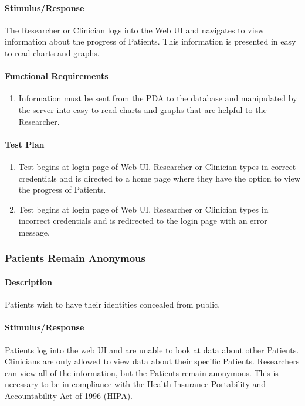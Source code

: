 \documentclass{article}
\begin{document}
\paragraph{Stimulus/Response}
The Researcher or Clinician logs into the Web UI and navigates to view information about the progress of Patients.  This information is presented in easy to read charts and graphs.

\paragraph{Functional Requirements}
\begin{enumerate}
\item Information must be sent from the PDA to the database and manipulated by the server into easy to read charts and graphs that are helpful to the Researcher.
\end{enumerate}

\paragraph{Test Plan}
\begin{enumerate}
\item Test begins at login page of Web UI.  Researcher or Clinician types in correct credentials and is directed to a home page where they have the option to view the progress of Patients.
\item Test begins at login page of Web UI.  Researcher or Clinician types in incorrect credentials and is redirected to the login page with an error message.
\end{enumerate}

\subsubsection{Patients Remain Anonymous}\label{sec: Anonymous}

\paragraph{Description}
Patients wish to have their identities concealed from public.

\paragraph{Stimulus/Response}
Patients log into the web UI and are unable to look at data about other Patients.  Clinicians are only allowed to view data about their specific Patients.   Researchers can view all of the information, but the Patients remain anonymous. This is necessary to be in compliance with the Health Insurance Portability and Accountability Act of 1996 (HIPA).
\end{document}

